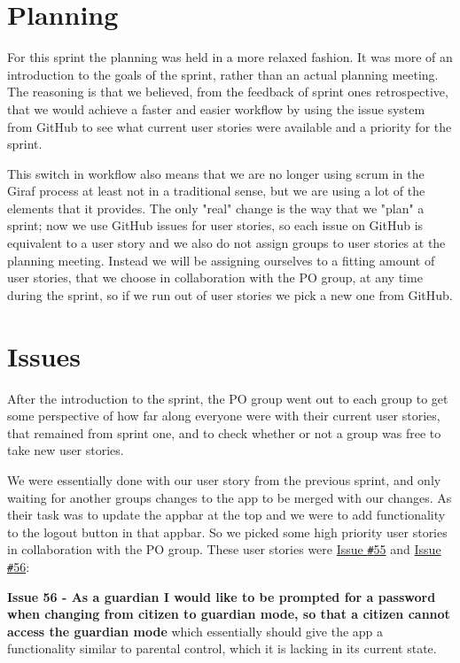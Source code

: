 \section{Planning}\label{sprint2Planning}
For this sprint the planning was held in a more relaxed fashion.
It was more of an introduction to the goals of the sprint, rather than an actual planning meeting.
The reasoning is that we believed, from the feedback of sprint ones retrospective, that we would achieve a faster and easier workflow by using the issue system from GitHub to see what current user stories were available and a priority for the sprint.

This switch in workflow also means that we are no longer using scrum in the Giraf process at least not in a traditional sense, but we are using a lot of the elements that it provides.
The only "real" change is the way that we "plan" a sprint; now we use GitHub issues for user stories, so each issue on GitHub is equivalent to a user story and we also do not assign groups to user stories at the planning meeting.
Instead we will be assigning ourselves to a fitting amount of user stories, that we choose in collaboration with the PO group, at any time during the sprint, so if we run out of user stories we pick a new one from GitHub.

\section{Issues}\label{sprint2planstories}
After the introduction to the sprint, the PO group went out to each group to get some perspective of how far along everyone were with their current user stories, that remained from sprint one, and to check whether or not a group was free to take new user stories.

We were essentially done with our user story from the previous sprint, and only waiting for another groups changes to the app to be merged with our changes.
As their task was to update the appbar at the top and we were to add functionality to the logout button in that appbar.
So we picked some high priority user stories in collaboration with the PO group.
These user stories were \href{https://github.com/aau-giraf/wiki/issues/55}{Issue \texttt{\#}55} and \href{https://github.com/aau-giraf/wiki/issues/56}{Issue \texttt{\#}56}:

\textbf{Issue 56 - As a guardian I would like to be prompted for a password when changing from citizen to guardian mode, so that a citizen cannot access the guardian mode} which essentially should give the app a functionality similar to parental control, which it is lacking in its current state.

